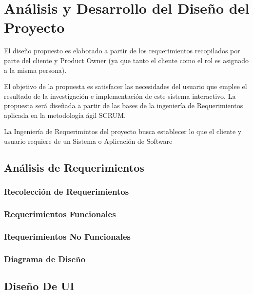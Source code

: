 \chapter{Análisis  y Desarrollo del Diseño del Proyecto}

El diseño propuesto es elaborado a partir de los requerimientos recopilados por parte del cliente y Product Owner (ya que tanto el cliente como el rol es asignado a la misma persona).

El objetivo de la propuesta es satisfacer las necesidades del usuario que emplee el resultado de la investigación e implementación de este sistema interactivo. La propuesta será diseñada a partir de las bases de la ingeniería de Requerimientos aplicada en la metodología ágil SCRUM.

La Ingeniería de Requerimintos del proyecto busca establecer lo que el cliente y usuario requiere de un Sistema o Aplicación de Software


\section{Análisis de Requerimientos}


\subsection{Recolección de Requerimientos}


\subsection{Requerimientos Funcionales}


\subsection{Requerimientos No Funcionales}


\subsection{Diagrama de Diseño}

\section{Diseño De UI}

\section{}
